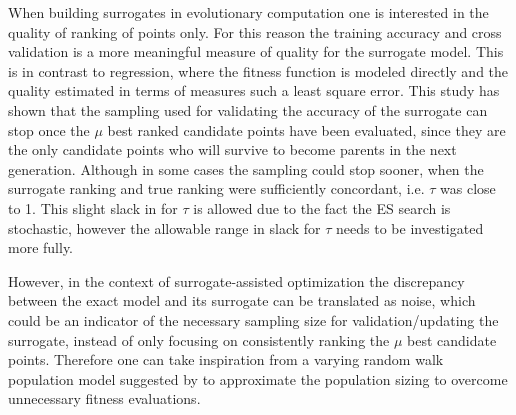 \documentclass[conference]{IEEEtran}
\begin{document}
When building surrogates in evolutionary computation one is interested in the quality of ranking of points only. For this reason the training accuracy and cross validation is a more meaningful measure of quality for the surrogate model. This is in contrast to regression, where the fitness function is modeled directly and the quality estimated in terms of measures such a least square error. 
This study has shown that the sampling used for validating the accuracy of the surrogate can stop once the $\mu$ best ranked candidate points have been evaluated, since they are the only candidate points who will survive to become parents in the next generation. 
Although in some cases the sampling could stop sooner, when the surrogate ranking and true ranking were sufficiently concordant, i.e. $\tau$ was close to 1. This slight slack in for $\tau$ is allowed due to the fact the ES search is stochastic, however the allowable range in slack for $\tau$ needs to be investigated more fully. 

However, in the context of surrogate-assisted optimization the discrepancy between the exact model and its surrogate can be translated as noise, which could be an indicator of the necessary sampling size for validation/updating the surrogate, instead of only focusing on consistently ranking the $\mu$ best candidate points. Therefore one can take inspiration from a varying random walk population model suggested by \cite{Miller1997} to approximate the population sizing to overcome unnecessary fitness evaluations.





\end{document}
